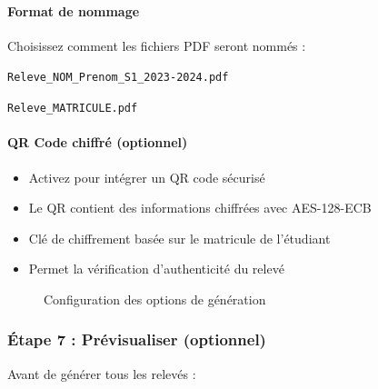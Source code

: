 \paragraph{Format de nommage}

Choisissez comment les fichiers PDF seront nommés :

\begin{description}[leftmargin=3.5cm]
    \item[Détaillé (défaut)] \texttt{Releve\_NOM\_Prenom\_S1\_2023-2024.pdf}
    \item[Simple] \texttt{Releve\_MATRICULE.pdf}
\end{description}

\paragraph{QR Code chiffré (optionnel)}

\begin{itemize}[leftmargin=*]
    \item Activez  pour intégrer un QR code sécurisé
    \item Le QR contient des informations chiffrées avec AES-128-ECB
    \item Clé de chiffrement basée sur le matricule de l'étudiant
    \item Permet la vérification d'authenticité du relevé
\end{itemize}

\begin{figure}[h]
    \centering
    \caption{Configuration des options de génération}
\end{figure}

\subsubsection{Étape 7 : Prévisualiser (optionnel)}

Avant de générer tous les relevés :

